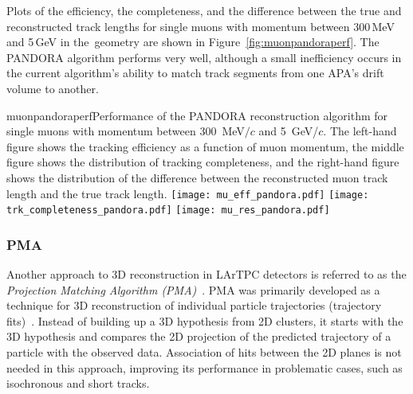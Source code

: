 

Plots of the efficiency, the completeness, and the  difference between the true and reconstructed
track lengths for single muons with momentum between 300\,MeV and 5\,GeV in the~\pdsp geometry are
shown in Figure~\ref{fig:muonpandoraperf}.  The PANDORA algorithm performs very well, although a small
inefficiency occurs in the current algorithm's ability to match track segments from one APA's drift volume to another.

\begin{cdrfigure}{muonpandoraperf}{Performance of the PANDORA reconstruction algorithm for single muons with 
momentum between 300~MeV$/c$ and 5~GeV/$c$.  The left-hand figure shows the tracking efficiency as a function of
muon momentum, the middle figure shows the distribution of tracking completeness, and the right-hand figure shows the
distribution of the difference between the reconstructed muon track length and the true track length.}
\texttt{[image: mu\_eff\_pandora.pdf]}
\texttt{[image: trk\_completeness\_pandora.pdf]}
\texttt{[image: mu\_res\_pandora.pdf]}
\end{cdrfigure}


\subsubsection{PMA}

Another approach to 3D reconstruction in LArTPC detectors is referred to as the \textit{Projection Matching Algorithm
(PMA)}~\cite{pma_algorithm}. PMA was primarily developed as a technique for 3D reconstruction
of individual particle trajectories (trajectory fits)~\cite{icarus3dreco}. Instead of
building up a 3D hypothesis from 2D clusters, it starts with the 3D hypothesis and compares
the 2D projection of the predicted trajectory of a particle with the observed data. Association
of hits between the 2D planes is not needed in this approach, improving its performance in
problematic cases, such as isochronous and short tracks.

